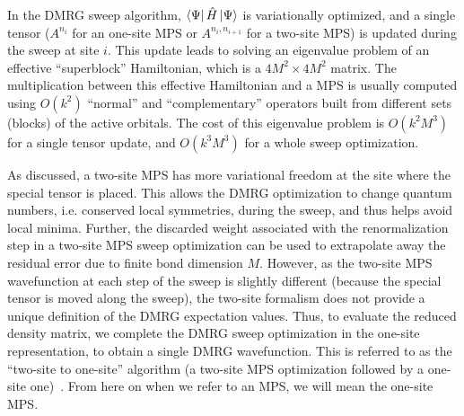 
In the DMRG sweep algorithm, $\bra{\Psi}\hat{H}\ket{\Psi}$ is variationally optimized, and  a single tensor ($A^{n_i}$ for an one-site MPS or $A^{n_i, n_{i+1}}$ for a two-site MPS) is updated during the sweep at site $i$. This update leads to solving an eigenvalue problem of an effective ``superblock'' Hamiltonian, 
which is a $4M^2\times 4M^2$ matrix. 
The multiplication between this effective Hamiltonian and a MPS is usually computed using $O(k^2)$ ``normal'' and ``complementary'' operators 
built from different sets (blocks) of the active orbitals. The cost of this eigenvalue problem is $O(k^2M^3)$ for a single tensor update, and $O(k^3M^3)$ 
for a whole sweep optimization. 

As discussed, a two-site MPS has more variational freedom at the site where the special tensor is placed. This allows 
the DMRG optimization to change quantum numbers, i.e. conserved local symmetries, during the sweep, and thus helps avoid local minima. Further,
the discarded weight associated with the renormalization step in a two-site MPS sweep optimization can be used to extrapolate away the residual 
error due to finite bond dimension $M$. 
However, as the two-site MPS wavefunction at each step of the sweep 
is slightly different (because the special tensor is moved along the sweep),
the two-site formalism does not provide a unique definition of the DMRG 
expectation values.
Thus, to evaluate the reduced density matrix, we complete the DMRG
sweep optimization in the one-site representation, to obtain a single 
DMRG wavefunction. This is
referred to as the ``two-site to one-site'' algorithm (a two-site MPS optimization followed by a one-site one)~\cite{olivares-amaya_ab-initio_2015}. 
From here on when we refer to an MPS, we will mean the one-site MPS.


